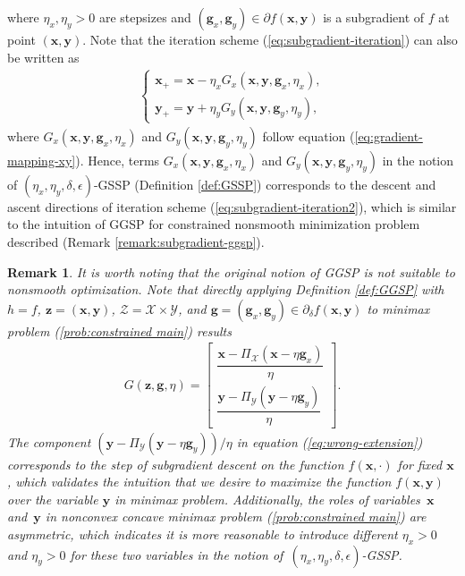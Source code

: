 \documentclass[11pt]{article}
\def\vg{\mathbf{g}}
\def\vx{\mathbf{x}}
\def\vy{\mathbf{y}}
\def\vz{\mathbf{z}}
\def\fX{{\mathcal{X}}}
\def\fY{{\mathcal{Y}}}
\def\fZ{{\mathcal{Z}}}
\newtheorem{remark}{Remark}
\begin{document}
where $\eta_x,\eta_y>0$ are stepsizes and $(\vg_x,\vg_y)\in\partial f(\vx,\vy)$ is a subgradient of $f$ at point $(\vx,\vy)$.
Note that the iteration scheme (\ref{eq:subgradient-iteration}) can also be written as
\begin{align}\label{eq:subgradient-iteration2}
    \begin{cases}
        \vx_+ = \vx - \eta_x G_x(\vx, \vy,\vg_{x},\eta_x), \\[0.1cm]
        \vy_+ = \vy + \eta_y G_y(\vx, \vy,\vg_{y},\eta_y),
    \end{cases}
\end{align}
where $G_x(\vx, \vy,\vg_{x},\eta_x)$ and $G_y(\vx, \vy,\vg_{y},\eta_y)$ follow equation (\ref{eq:gradient-mapping-xy}).
Hence, terms $G_x(\vx, \vy,\vg_{x},\eta_x)$ and $G_y(\vx, \vy,\vg_{y},\eta_y)$ in the notion of $(\eta_x,\eta_y,\delta, \epsilon)$-GSSP (Definition \ref{def:GSSP}) corresponds to the descent and ascent directions of iteration scheme (\ref{eq:subgradient-iteration2}), 
which is similar to the intuition of GGSP for constrained nonsmooth minimization problem described (Remark \ref{remark:subgradient-ggsp}).

\begin{remark}
It is worth noting that the original notion of GGSP \citep{liu2024zeroth} is not suitable to nonsmooth optimization. 
Note that directly applying Definition \ref{def:GGSP} with $h=f$, $\vz=(\vx,\vy)$, $\fZ=\fX\times\fY$, and $\vg=(\vg_x,\vg_y)\in\partial_\delta f(\vx,\vy)$ to minimax problem (\ref{prob:constrained main}) results
\begin{align}\label{eq:wrong-extension}
    G(\vz,\vg,\eta) = \begin{bmatrix}
    \dfrac{\vx-\Pi_\mathcal{X}\left(\vx - \eta \vg_{x}\right) }{\eta} \\[0.35cm]
    \dfrac{\vy-\Pi_\mathcal{Y}\left(\vy - \eta \vg_{y}\right) }{\eta}
    \end{bmatrix}.
\end{align} The component $(\vy-\Pi_\mathcal{Y}\left(\vy - \eta \vg_{y}\right))/{\eta}$ in equation (\ref{eq:wrong-extension}) corresponds to the step of subgradient descent on the function $f(\vx,\cdot)$ for fixed $\vx$, which validates the intuition that we desire to maximize the function $f(\vx,\vy)$ over the variable $\vy$ in minimax problem.
Additionally, the roles of variables~$\vx$ and~$\vy$ in nonconvex concave minimax problem (\ref{prob:constrained main}) are asymmetric, which indicates it is more reasonable to introduce different $\eta_x>0$ and $\eta_y>0$ for these two variables in the notion of~$(\eta_x,\eta_y,\delta, \epsilon)$-GSSP.
\end{remark}
\end{document}
